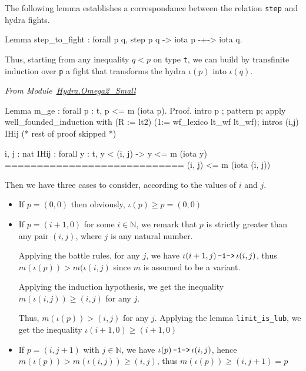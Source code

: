The following lemma establishes a correspondance between the relation
\texttt{step} and hydra fights.

\begin{Coqsrc}
Lemma step_to_fight : forall p q, step p q -> iota p -+-> iota q.
\end{Coqsrc}


Thus, starting from any inequality $q < p$ on type \texttt{t}, we can build 
by transfinite induction over \texttt{p} a fight 
that transforms the hydra $\iota(p)$ into $\iota(q)$.

\vspace{4pt}
\emph{From Module~\href{../src/html/hydras.Hydra.Omega2_Small.html\#m_ge}{Hydra.Omega2\_Small}}

\begin{Coqsrc}
Lemma m_ge : forall p : t,   p <= m (iota p).
Proof.
  intro p ; pattern p;
    apply  well_founded_induction with 
               (R := lt2) (1:= wf_lexico lt_wf lt_wf);
     intros (i,j) IHij (* rest of proof skipped *)
\end{Coqsrc}

\begin{Coqanswer}
  i, j : nat
  IHij : forall y : t, y < (i, j) -> y <= m (iota y)
  ============================
  (i, j) <= m (iota (i, j)) 
\end{Coqanswer}


Then we have  three cases to consider, according to the values of $i$ and $j$.
\begin{itemize}
\item If $p=(0,0)$ then obviously, $\iota(p)\geq p = (0,0)$
\item If  $p=(i+1,0)$ for some $i\in\mathbb{N}$, we
 remark  that $p$ is strictly greater than any pair $ (i, j)$, where $j$ 
is any natural number.

Applying the battle rules, for any $j$, we have $\iota(i+1,j)  {\mbox{\,\texttt{-1->}\,}} \iota(i, j) $, thus $m(\iota(p)) > m(\iota(i,j)$ since  $m$ is assumed to be a variant.

Applying the induction hypothesis, we get the inequality
 $ m(\iota(i,j)) \geq (i,j)$ for any $j$. 

Thus, $m(\iota(p)) > (i,j)$ for any $j$.
Applying the lemma \texttt{limit\_is\_lub}, we get  the inequality
$\iota(i+1,0)\geq (i+1,0)$

\item If $p=(i,j+1)$ with $j\in\mathbb{N}$, we have  $\iota(p)  {\mbox{\,\texttt{-1->}\,}} \iota(i, j) $,
hence $m(\iota(p))> m(\iota(i,j)) \geq (i,j)$, thus $m(\iota(p))\geq (i,j+1)=p$

\end{itemize}

